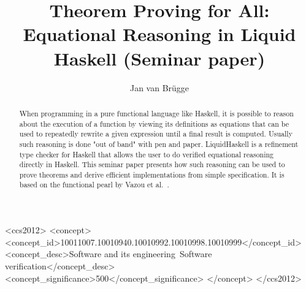 \documentclass[acmlarge,screen,authorversion=true,nonacm=true]{acmart}
\begin{document}
\title{Theorem Proving for All: Equational Reasoning in Liquid Haskell (Seminar paper)}

\author{Jan van Brügge}


\begin{abstract}
When programming in a pure functional language like Haskell, it is possible to reason about the execution of a function by viewing its definitions as equations that can be used to repeatedly rewrite a given expression until a final result is computed. Usually such reasoning is done "out of band" with pen and paper. LiquidHaskell is a refinement type checker for Haskell that allows the user to do verified equational reasoning directly in Haskell. This seminar paper presents how such reasoning can be used to prove theorems and derive efficient implementations from simple specification. It is based on the functional pearl by Vazou et al.~\cite{tpfa}.
\end{abstract}

\begin{CCSXML}
<ccs2012>
   <concept>
       <concept_id>10011007.10010940.10010992.10010998.10010999</concept_id>
       <concept_desc>Software and its engineering~Software verification</concept_desc>
       <concept_significance>500</concept_significance>
       </concept>
 </ccs2012>
\end{CCSXML}
\end{document}
